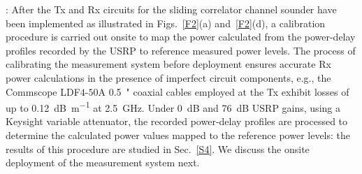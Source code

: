 \documentclass[12pt, draftcls, onecolumn]{IEEEtran}
\begin{document}
: After the Tx and Rx circuits for the sliding correlator channel sounder have been implemented as illustrated in Figs.~\ref{F2}(a) and~\ref{F2}(d), a calibration procedure is carried out onsite to map the power calculated from the power-delay profiles recorded by the USRP to reference measured power levels. The process of calibrating the measurement system before deployment ensures accurate Rx power calculations in the presence of imperfect circuit components, e.g., the Commscope LDF$4$-$50$A \SI{0.5}{{"}} coaxial cables employed at the Tx exhibit losses of up to \SI{0.12}{\deci\bel\per\meter} at \SI{2.5}{\giga\hertz}. Under \SI{0}{\deci\bel} and \SI{76}{\deci\bel} USRP gains, using a Keysight variable attenuator, the recorded power-delay profiles are processed to determine the calculated power values mapped to the reference power levels: the results of this procedure are studied in Sec.~\ref{S4}. We discuss the onsite deployment of the measurement system next.
\end{document}
